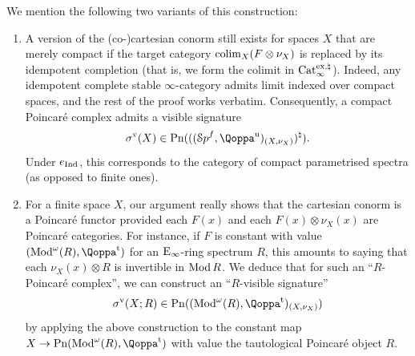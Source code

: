 \medskip



\begin{remark}
We mention the following two variants of this construction:
\begin{enumerate}
\item A version of the (co-)cartesian conorm still exists for spaces $X$ that are merely compact %
if the target category $\mathop{\mathrm{colim}}_X (F\otimes \nu_X)$ is replaced by its idempotent completion (that is, we form the colimit in $\mathrm{Cat}^{\mathrm{ex},\natural}_{\infty}$). Indeed, any idempotent complete stable $\infty$-category admits limit indexed over compact spaces, and the rest of the proof works verbatim. Consequently, a compact Poincar\'e complex admits a visible signature 
\[
\vsign(X)\in \Poinc(((\Spa^f, \QF^{\uni})_{(X, \nu_X)})^\natural).
\]
Under $e_{\operatorname{Ind}}$, this corresponds to the category of compact parametrised spectra (as opposed to finite ones). 
 \item For a finite space $X$, our argument really shows that the cartesian conorm is a Poincar\'e functor provided each $F(x)$ and each $F(x)\otimes \nu_X(x)$ are Poincar\'e categories.
For instance, if $F$ is constant with value $(\Mod^\omega(R), \QF^\tate)$
for an ${\mathrm{E}_{\infty}}$-ring spectrum $R$, this amounts to saying that each $\nu_X(x)\otimes R$ is invertible in $\operatorname{Mod}{R}$. We deduce that for such an ``$R$-Poincar\'e complex'', we can construct an ``$R$-visible signature''
\[
\vsign(X; R)\in \Poinc((\Mod^\omega(R), \QF^\tate)_{(X, \nu_X)})
\]
by applying the above construction to the constant map $X\to \Poinc(\Mod^\omega(R), \QF^\tate)$ with value the tautological Poincar\'e object $R$. 
\end{enumerate}
\end{remark}


\medskip

